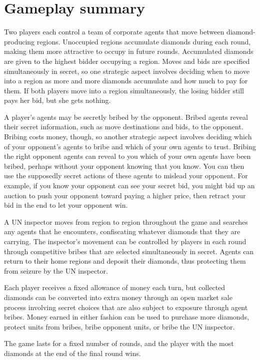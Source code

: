 \documentclass[12pt]{article}
\begin{document}
\section{Gameplay summary}

Two players each control a team of corporate agents that move between diamond-producing regions.  Unoccupied regions accumulate diamonds during each round, making them more attractive to occupy in future rounds.  Accumulated diamonds are given to the highest bidder occupying a region.  Moves and bids are specified simultaneously in secret, so one strategic aspect involves deciding when to move into a region as more and more diamonds accumulate and how much to pay for them.  If both players move into a region simultaneously, the losing bidder still pays her bid, but she gets nothing.

A player's agents may be secretly bribed by the opponent.  Bribed agents reveal their secret information, such as move destinations and bids, to the opponent.  Bribing costs money, though, so another strategic aspect involves deciding which of your opponent's agents to bribe and which of your own agents to trust.  Bribing the right opponent agents can reveal to you which of your own agents have been bribed, perhaps without your opponent knowing that you know.  You can then use the supposedly secret actions of these agents to mislead your opponent.  For example, if you know your opponent can see your secret bid, you might bid up an auction to push your opponent toward paying a higher price, then retract your bid in the end to let your opponent win.

A UN inspector moves from region to region throughout the game and searches any agents that he encounters, confiscating whatever diamonds that they are carrying.  The inspector's movement can be controlled by players in each round through competitive bribes that are selected simultaneously in secret.  Agents can return to their home regions and deposit their diamonds, thus protecting them from seizure by the UN inspector.

Each player receives a fixed allowance of money each turn, but collected diamonds can be converted into extra money through an open market sale process involving secret choices that are also subject to exposure through agent bribes.  Money earned in either fashion can be used to purchase more diamonds, protect units from bribes, bribe opponent units, or bribe the UN inspector.  

The game lasts for a fixed number of rounds, and the player with the most diamonds at the end of the final round wins.
\end{document}
